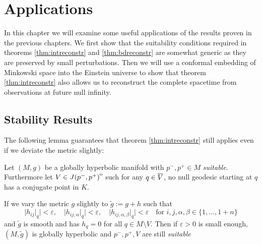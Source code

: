 \chapter{Applications}
In this chapter we will examine some useful applications of the results proven in the previous chapters. We first show that the suitability conditions required in theorems \ref{thm:intreconstr} and \ref{thm:bdreconstr} are somewhat generic as they are preserved by small perturbations. Then we will use a conformal embedding of Minkowski space into the Einstein universe to show that theorem \ref{thm:intreconstr} also allows us to reconstruct the complete spacetime from observations at future null infinity.

\section{Stability Results}
The following lemma guarantees that theorem \ref{thm:intreconstr} still applies even if we deviate the metric slightly:
\begin{lemma}
    Let $(M,g)$ be a globally hyperbolic manifold with $p^-,p^+\in M$ \emph{suitable}. Furthermore let $V\in {\kern0ptJ(p^-,p^+)}^{\mathrm{o}}$ such for any $q\in {\overline{V}}$, no null geodesic starting at $q$ has a conjugate point in $K$.

    If we vary the metric $g$ slightly to $\widetilde{g}:=g+h$ such that 
    \[
        \lvert h_{ij}\rvert_q \rvert <\varepsilon, \quad \lvert h_{ij,\alpha}\rvert_q \rvert <\varepsilon, \quad \lvert h_{ij,\alpha,\beta}\rvert_q \rvert <\varepsilon \quad \text{for }i,j,\alpha,\beta\in \{1,\dots, 1+n\}
    \]
    and $\widetilde{g}$ is smooth and has $h_q=0$ for all $q\in M\setminus V$. Then if $\varepsilon>0$ is small enough, $(M,\widetilde{g})$ is globally hyperbolic and $p^-,p^+,V$ are still \emph{suitable}
\end{lemma}

